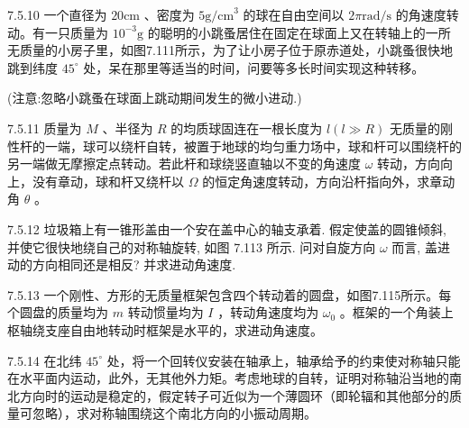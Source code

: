 \begin{problem}{7.5.10}
一个直径为 $20\mathrm{cm}$ 、密度为 $5\mathrm{g/cm}^3$ 的球在自由空间以 $2\pi \mathrm{rad/s}$ 的角速度转动。有一只质量为 $10^{-3}\mathrm{g}$ 的聪明的小跳蚤居住在固定在球面上又在转轴上的一所无质量的小房子里，如图7.111所示，为了让小房子位于原赤道处，小跳蚤很快地跳到纬度 $45^{\circ}$ 处，呆在那里等适当的时间，问要等多长时间实现这种转移。

(注意:忽略小跳蚤在球面上跳动期间发生的微小进动.)
\begin{center}

\end{center}
\end{problem}
\clearpage


\begin{problem}{7.5.11}
质量为 $M$ 、半径为 $R$ 的均质球固连在一根长度为 $l(l \gg R)$ 无质量的刚性杆的一端，球可以绕杆自转，被置于地球的均匀重力场中，球和杆可以围绕杆的另一端做无摩擦定点转动。若此杆和球绕竖直轴以不变的角速度 $\omega$ 转动，方向向上，没有章动，球和杆又绕杆以 $\Omega$ 的恒定角速度转动，方向沿杆指向外，求章动角 $\theta$ 。
\end{problem}
\clearpage


\begin{problem}{7.5.12}
垃圾箱上有一锥形盖由一个安在盖中心的轴支承着. 假定使盖的圆锥倾斜, 并使它很快地绕自己的对称轴旋转, 如图 7.113 所示. 问对自旋方向 $\omega$ 而言, 盖进动的方向相同还是相反? 并求进动角速度.
\begin{center}

\end{center}
\end{problem}
\clearpage


\begin{problem}{7.5.13}
一个刚性、方形的无质量框架包含四个转动着的圆盘，如图7.115所示。每个圆盘的质量均为 $m$ 转动惯量均为 $I$ ，转动角速度均为 $\omega_0$ 。框架的一个角装上枢轴绕支座自由地转动时框架是水平的，求进动角速度。
\begin{center}

\end{center}
\end{problem}
\clearpage


\begin{problem}{7.5.14}
在北纬 $45^{\circ}$ 处，将一个回转仪安装在轴承上，轴承给予的约束使对称轴只能在水平面内运动，此外，无其他外力矩。考虑地球的自转，证明对称轴沿当地的南北方向时的运动是稳定的，假定转子可近似为一个薄圆环（即轮辐和其他部分的质量可忽略），求对称轴围绕这个南北方向的小振动周期。
\end{problem}
\clearpage


